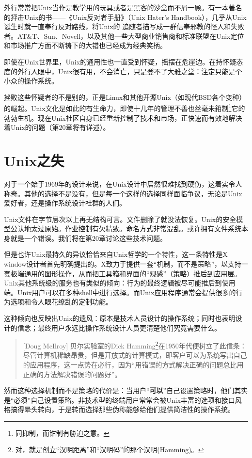 \documentclass[12pt,oneside]{book}
\begin{document}
外行常常把Unix当作是教学用的玩具或者是黑客的沙盒而不屑一顾。有一本著名的抨击Unix的书——《Unix反对者手册》（Unix Hater's Handbook）\cite{Garfinkel}，几乎从Unix诞生时就一直奉行反对路线，将Unix的 追随者描写成一群信奉邪教的怪人和失败者。AT\&{}T、Sun、Novell，以及其他一些大型商业销售商和标准联盟在Unix定位和市场推广方面不断铸下的大错也已经成为经典笑柄。

即使在Unix世界里，Unix的通用性也一直受到怀疑，摇摆在危崖边。在持怀疑态度的外行人眼中，Unix很有用，不会消亡，只是登不了大雅之堂：注定只能是个小众的操作系统。

挫败这些怀疑者的不是别的，正是Linux和其他开源Unix（如现代BSD各个变种）的崛起。Unix文化是如此的有生命力，即使十几年的管理不善也丝毫未箝制\footnote{同抑制，而钳制有胁迫之意。}它的勃勃生机。现在Unix社区自身已经重新控制了技术和市场，正快速而有效地解决着Unix的问题（第20章将有详述）。


\section{Unix之失}
对于一个始于1969年的设计来说，在Unix设计中居然很难找到硬伤，这着实令人称奇。其他的选择不是没有，但是每一个这样的选择同样面临争议，无论是Unix爱好者，还是操作系统设计社群的人们。

Unix文件在字节层次以上再无结构可言。文件删除了就没法恢复。Unix的安全模型公认地太过原始。作业控制有欠精致。命名方式非常混乱。或许拥有文件系统本身就是一个错误。我们将在第20章讨论这些技术问题。

但是也许Unix最持久的异议恰恰来自Unix哲学的一个特性，这一条特性是X window设计者首先明确提出的。X致力于提供一套“机制，而不是策略”，以支持一套极端通用的图形操作，从而把工具箱和界面的“观感”（策略）推后到应用层。Unix其他系统级的服务也有类似的倾向：行为的最终逻辑被尽可能推后到使用端。Unix用户可以在多种shell中进行选择。而Unix应用程序通常会提供很多的行为选项和令人眼花缭乱的定制功能。

这种倾向也反映出Unix的遗风：原本是技术人员设计的操作系统；同时也表明设计的信念；最终用户永远比操作系统设计人员更清楚他们究竟需要什么。

\begin{quote}[Doug McIlroy]
贝尔实验室的Dick Hamming\footnote{对，就是创立“汉明距离”和“汉明码”的那个汉明(Hamming)。}在1950年代便树立了此信条：尽管计算机稀缺昂贵，但是开放式的计算模式，即客户可以为系统写出自己的应用程序，这一点势在必行，因为“用错误的方式解决正确的问题总比用正确的方法解决错误的问题好”。
\end{quote}

然而这种选择机制而不是策略的代价是：当用户“\textbf{可以}”自己设置策略时，他们其实是“必须”自己设置策略。非技术型的终端用户常常会被Unix丰富的选项和接口风格搞得晕头转向，于是转而选择那些伪称能够给他们提供简洁性的操作系统。
\end{document}
